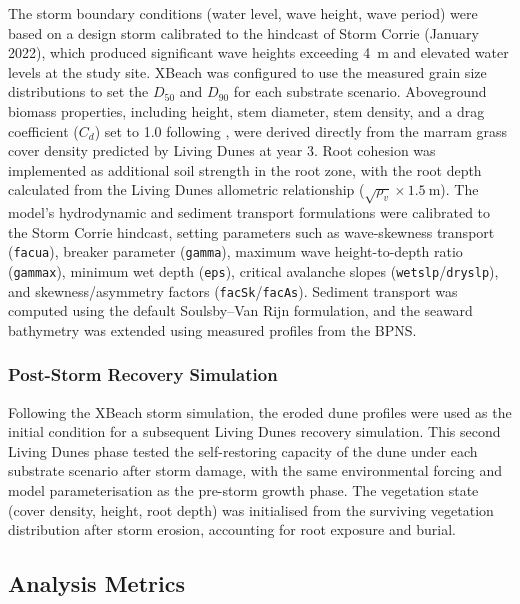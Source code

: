 \documentclass[authoryear,preprint,review,12pt]{elsarticle}
\begin{document}
The storm boundary conditions (water level, wave height, wave period) were based on a design storm calibrated to the hindcast of Storm Corrie (January 2022), which produced significant wave heights exceeding \SI{4}{\metre} and elevated water levels at the study site. XBeach was configured to use the measured grain size distributions to set the $D_{50}$ and $D_{90}$ for each substrate scenario. Aboveground biomass properties, including height, stem diameter, stem density, and a drag coefficient ($C_d$) set to 1.0 following \citet{mendez2004estimation}, were derived directly from the marram grass cover density predicted by Living Dunes at year 3. Root cohesion was implemented as additional soil strength in the root zone, with the root depth calculated from the Living Dunes allometric relationship ($\sqrt{\rho_v} \times \SI{1.5}{\metre}$). The model's hydrodynamic and sediment transport formulations were calibrated to the Storm Corrie hindcast, setting parameters such as wave-skewness transport (\texttt{facua}), breaker parameter (\texttt{gamma}), maximum wave height-to-depth ratio (\texttt{gammax}), minimum wet depth (\texttt{eps}), critical avalanche slopes (\texttt{wetslp}/\texttt{dryslp}), and skewness/asymmetry factors (\texttt{facSk}/\texttt{facAs}). Sediment transport was computed using the default Soulsby--Van Rijn formulation, and the seaward bathymetry was extended using measured profiles from the BPNS.

\subsubsection{Post-Storm Recovery Simulation}

Following the XBeach storm simulation, the eroded dune profiles were used as the initial condition for a subsequent Living Dunes recovery simulation. This second Living Dunes phase tested the self-restoring capacity of the dune under each substrate scenario after storm damage, with the same environmental forcing and model parameterisation as the pre-storm growth phase. The vegetation state (cover density, height, root depth) was initialised from the surviving vegetation distribution after storm erosion, accounting for root exposure and burial.


\subsection{Analysis Metrics}
\end{document}
